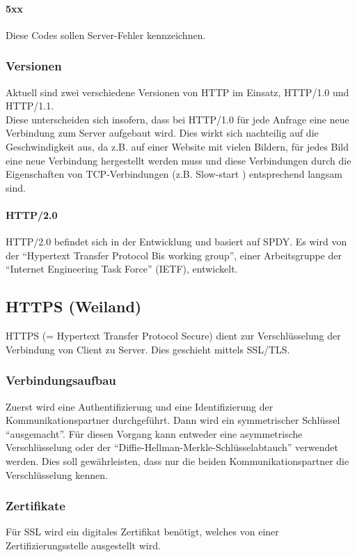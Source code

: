 \paragraph{5xx}
Diese Codes sollen Server-Fehler kennzeichnen.

\subsubsection{Versionen}
Aktuell sind zwei verschiedene Versionen von HTTP im Einsatz, HTTP/1.0 und HTTP/1.1.
\\
Diese unterscheiden sich insofern, dass bei HTTP/1.0 für jede Anfrage eine neue Verbindung zum Server aufgebaut wird. Dies wirkt sich nachteilig auf die Geschwindigkeit aus, da z.B. auf einer Website mit vielen Bildern, für jedes Bild eine neue Verbindung hergestellt werden muss und diese Verbindungen durch die Eigenschaften von TCP-Verbindungen (z.B. Slow-start ) entsprechend langsam sind.

\paragraph{HTTP/2.0}  HTTP/2.0 befindet sich in der Entwicklung und basiert auf SPDY. Es wird von der \enquote{Hypertext Transfer Protocol Bis working group}, einer Arbeitsgruppe der \enquote{Internet Engineering Task Force} (IETF), entwickelt.

\subsection{HTTPS (Weiland)}
HTTPS (= Hypertext Transfer Protocol Secure) dient zur Verschlüsselung der Verbindung von Client zu Server. Dies geschieht mittels SSL/TLS.
\subsubsection{Verbindungsaufbau}
Zuerst wird eine Authentifizierung und eine Identifizierung der Kommunikationspartner durchgeführt. Dann wird ein symmetrischer Schlüssel \enquote{ausgemacht}. Für diesen Vorgang kann entweder eine asymmetrische Verschlüsselung oder der \enquote{Diffie-Hellman-Merkle-Schlüsselabtauch} verwendet werden. Dies soll gewährleisten, dass nur die beiden Kommunikationspartner die Verschlüsselung kennen.
\subsubsection{Zertifikate}
Für SSL wird ein digitales Zertifikat benötigt, welches von einer Zertifizierungsstelle ausgestellt wird.
